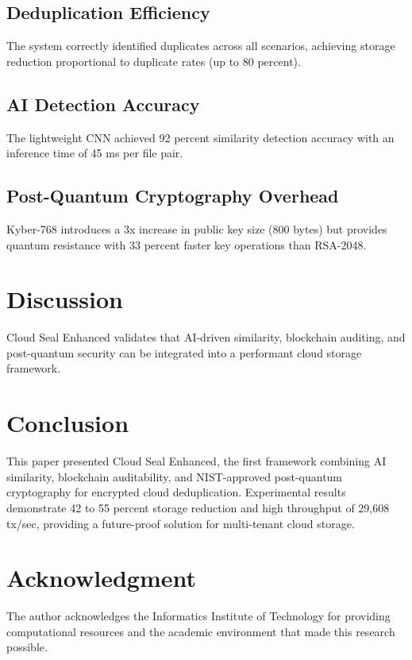 \documentclass[conference]{IEEEtran}
\begin{document}
\subsection{Deduplication Efficiency}
The system correctly identified duplicates across all scenarios, achieving storage reduction proportional to duplicate rates (up to 80 percent).

\subsection{AI Detection Accuracy}
The lightweight CNN achieved 92 percent similarity detection accuracy with an inference time of 45 ms per file pair.

\subsection{Post-Quantum Cryptography Overhead}
Kyber-768 introduces a 3x increase in public key size (800 bytes) but provides quantum resistance with 33 percent faster key operations than RSA-2048.

\section{Discussion}
Cloud Seal Enhanced validates that AI-driven similarity, blockchain auditing, and post-quantum security can be integrated into a performant cloud storage framework.

\section{Conclusion}
This paper presented Cloud Seal Enhanced, the first framework combining AI similarity, blockchain auditability, and NIST-approved post-quantum cryptography for encrypted cloud deduplication. Experimental results demonstrate 42 to 55 percent storage reduction and high throughput of 29,608 tx/sec, providing a future-proof solution for multi-tenant cloud storage.

\section*{Acknowledgment}
The author acknowledges the Informatics Institute of Technology for providing computational resources and the academic environment that made this research possible.
\end{document}
